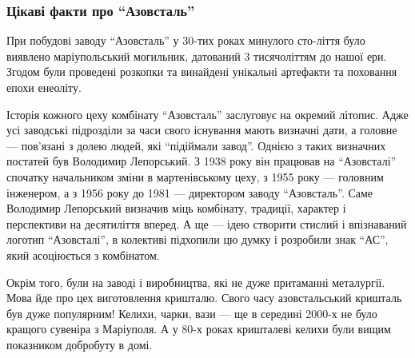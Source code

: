  
 
 
 
 

\subsubsection{Цікаві факти про \enquote{Азовсталь}}

При побудові заводу \enquote{Азовсталь} у 30-тих роках минулого сто\hyp{}ліття було виявлено
маріупольський могильник, датований 3 тисячоліттям до нашої ери. Згодом були
проведені розкопки та винайдені унікальні артефакти та поховання епохи
енеоліту.


Історія кожного цеху комбінату \enquote{Азовсталь} заслуговує на окремий літопис. Адже
усі заводські підрозділи за часи свого існування мають визначні дати, а головне
— пов'язані з долею людей, які \enquote{підіймали завод}. Однією з таких визначних
постатей був Володимир Лепорський. З 1938 року він працював на \enquote{Азовсталі}
спочатку начальником зміни в мартенівському цеху, з 1955 року — головним
інженером, а з 1956 року до 1981 — директором заводу \enquote{Азовсталь}. Саме
Володимир Лепорський визначив міць комбінату, традиції, характер і перспективи
на десятиліття вперед. А ще — ідею створити стислий і впізнаваний логотип
\enquote{Азовсталі}, в колективі підхопили цю думку і розробили знак \enquote{АС}, який
асоціюється з комбінатом.




Окрім того, були на заводі і виробництва, які не дуже притаманні металургії.
Мова йде про цех виготовлення кришталю. Свого часу азовстальський кришталь був
дуже популярним! Келихи, чарки, вази — ще в середині 2000-х не було кращого
сувеніра з Маріуполя. А у 80-х роках кришталеві келихи були вищим показником
добробуту в домі.

